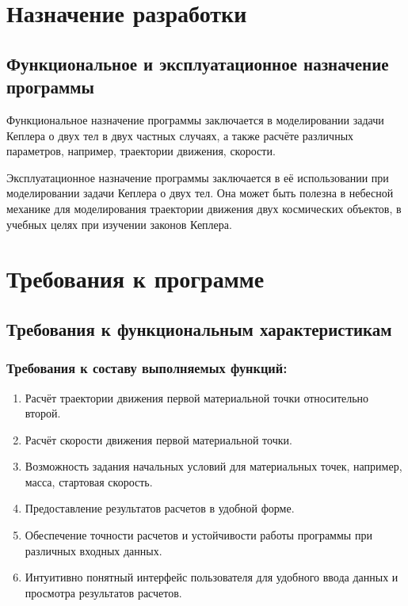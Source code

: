  \section{Назначение разработки}
 \subsection{Функциональное и эксплуатационное назначение программы}
 Функциональное назначение программы заключается в моделировании задачи Кеплера о двух тел в двух частных случаях, а также расчёте различных параметров, например, траектории движения, скорости.

 Эксплуатационное назначение программы заключается в её использовании при моделировании задачи Кеплера о двух тел. Она может быть полезна в небесной механике для моделирования траектории движения двух космических объектов, в учебных целях при изучении законов Кеплера.
 \section{Требования к программе}
 \subsection{Требования к функциональным характеристикам}

 \subsubsection{Требования к составу выполняемых функций:}

 \begin{enumerate}
  \item Расчёт траектории движения первой материальной точки относительно второй.
  \item Расчёт скорости движения первой материальной точки.
  \item Возможность задания начальных условий для материальных точек, например, масса, стартовая скорость.
  \item Предоставление результатов расчетов в удобной форме.
  \item Обеспечение точности расчетов и устойчивости работы программы при различных входных данных.
  \item Интуитивно понятный интерфейс пользователя для удобного ввода данных и просмотра результатов расчетов.
 \end{enumerate}

